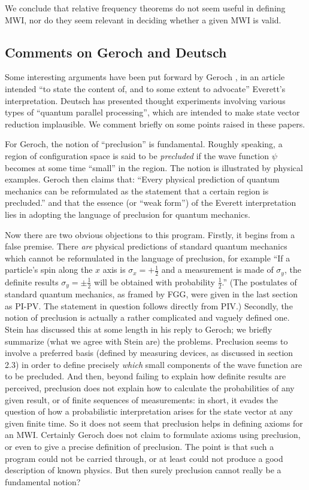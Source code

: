 \documentclass[aps,pra,12pt]{revtex4}
\begin{document}
We conclude that relative frequency theorems do not
seem useful in 
defining MWI, nor do they seem relevant in 
deciding whether a given MWI is valid. 

\subsection{Comments on Geroch and Deutsch}

Some interesting arguments have been put forward by Geroch \cite{ger}
,
in an article intended ``to state the content of, and to some extent to
advocate'' Everett's interpretation.  
Deutsch \cite{deutsch} 
has presented thought experiments involving various types of ``quantum 
parallel processing'', which are intended to make state vector reduction 
implausible.  We comment briefly on some points raised in these papers.

For Geroch, the notion of ``preclusion'' is fundamental.  Roughly speaking,
a region of configuration space is said to be {\em precluded} if the wave
function $\psi$ becomes at some time ``small'' in the region. 
The notion is illustrated by physical examples. 
Geroch then claims that: ``Every physical prediction of quantum mechanics can
be reformulated as the statement that a certain region is precluded.'' and
that the essence (or ``weak form'') of the Everett interpretation lies in
adopting the language of preclusion for quantum mechanics.

Now there are two obvious objections to this program. 
Firstly, it begins from a false premise. 
There {\em are} physical predictions of 
standard quantum mechanics which cannot be reformulated in the language
of preclusion, for example ``If a particle's spin along the $x$ axis is
$\sigma_x = +\frac{1}{2}$ and a measurement is made of $\sigma_y$, the
definite results $\sigma_y = \pm \frac{1}{2}$ will be obtained with
probability $\frac{1}{2}$.'' 
(The postulates of standard quantum mechanics, as framed by
FGG, were given in the last section as PI-PV. The statement in question
follows directly from PIV.) 
Secondly, the notion of preclusion is actually a rather complicated and 
vaguely defined one. 
Stein has discussed this at some length in his reply \cite{stein} to Geroch; 
we briefly summarize (what we agree with Stein are) the problems.
Preclusion seems to involve
a preferred basis (defined by measuring devices, as 
discussed in section 2.3) in order to define precisely {\em which}
small components of the wave function are to be precluded. 
And then, beyond failing to explain how definite results are
perceived, preclusion does not explain how to
calculate the probabilities of any given result, or of finite sequences 
of measurements: in short, it evades the question of how a probabilistic
interpretation arises for the state vector at any given finite time. 
So it does not seem that preclusion helps in defining axioms for an MWI.
Certainly Geroch does not claim to formulate axioms
using preclusion, or even to give a precise definition of preclusion.  
The point is that such a program could not be carried through, or at least 
could not produce a good description of known physics.
But then surely preclusion cannot really be a fundamental notion? 
 
\end{document}
